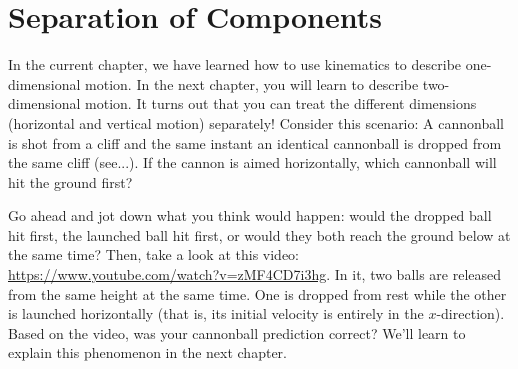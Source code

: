 \section{Separation of Components}
In the current chapter, we have learned how to use kinematics to describe 
one-dimensional motion. In the next chapter, you will learn to describe 
two-dimensional motion. It turns out that you can treat the different dimensions 
(horizontal and vertical motion) separately! Consider this scenario: A cannonball 
is shot from a cliff and the same instant an identical cannonball is dropped from 
the same cliff (see...). If the cannon is aimed horizontally, which cannonball 
will hit the ground first?


Go ahead and jot down what you think would happen: would the dropped ball hit 
first, the launched ball hit first, or would they both reach the ground below at 
the same time? Then, take a look at this video: 
\url{https://www.youtube.com/watch?v=zMF4CD7i3hg}. In it, two balls are released 
from the same height at the same time. One is dropped from rest while the other 
is launched horizontally (that is, its initial velocity is entirely in the 
$x$-direction). Based on the video, was your cannonball prediction correct? 
We'll learn to explain this phenomenon in the next chapter. 